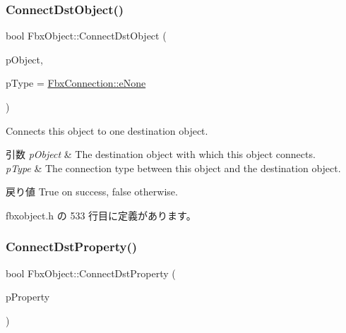 \mbox{\label{class_fbx_object_a3c7e883121fe1ceb271381146bd52ed0}} 
\subsubsection{\texorpdfstring{Connect\+Dst\+Object()}{ConnectDstObject()}}
{\footnotesize\ttfamily bool Fbx\+Object\+::\+Connect\+Dst\+Object (\begin{DoxyParamCaption}\item[{\hyperlink{class_fbx_object}{Fbx\+Object} $\ast$}]{p\+Object,  }\item[{\hyperlink{class_fbx_connection_a3df448a5db356652ab99fd2be2553749}{Fbx\+Connection\+::\+E\+Type}}]{p\+Type = {\ttfamily \hyperlink{class_fbx_connection_a3df448a5db356652ab99fd2be2553749a47aa04870c3c0769263e3972e67e9ebe}{Fbx\+Connection\+::e\+None}} }\end{DoxyParamCaption})\hspace{0.3cm}{\ttfamily [inline]}}

Connects this object to one destination object. 
\begin{DoxyParams}{引数}
{\em p\+Object} & The destination object with which this object connects. \\
\hline
{\em p\+Type} & The connection type between this object and the destination object. \\
\hline
\end{DoxyParams}
\begin{DoxyReturn}{戻り値}
{\ttfamily True} on success, {\ttfamily false} otherwise. 
\end{DoxyReturn}


 fbxobject.\+h の 533 行目に定義があります。

\mbox{\label{class_fbx_object_a6bd087870ae3d3dc82c89105387e7baa}} 
\subsubsection{\texorpdfstring{Connect\+Dst\+Property()}{ConnectDstProperty()}}
{\footnotesize\ttfamily bool Fbx\+Object\+::\+Connect\+Dst\+Property (\begin{DoxyParamCaption}\item[{const \hyperlink{class_fbx_property}{Fbx\+Property} \&}]{p\+Property }\end{DoxyParamCaption})\hspace{0.3cm}{\ttfamily [inline]}}

